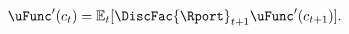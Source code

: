   \begin{equation}\begin{gathered}\begin{aligned}
        \uFunc^{\prime}({c}_{t})  & = \Ex_{t}[\DiscFac {\Rport}_{t+1} \uFunc^{\prime}({c}_{t+1})]. \label{eq:EulercRiskyR}
      \end{aligned}\end{gathered}\end{equation}
